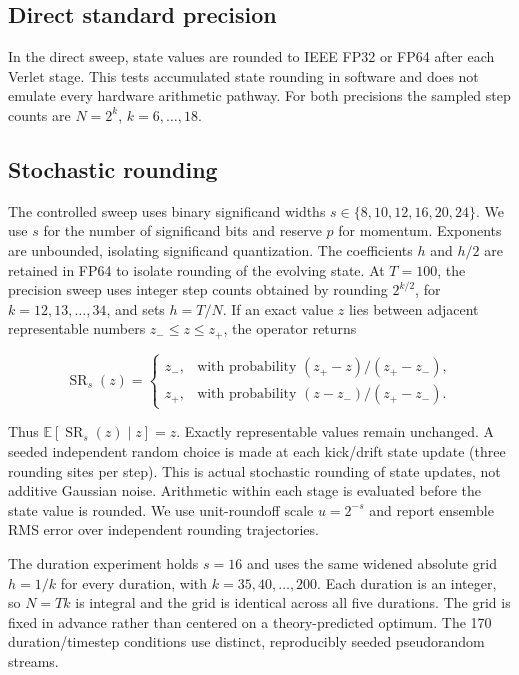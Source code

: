 \documentclass[
11pt
]{article}
\begin{document}
\subsection{Direct standard precision}\label{direct-standard-precision}

In the direct sweep, state values are rounded to IEEE FP32 or FP64 after
each Verlet stage. This tests accumulated state rounding in software and
does not emulate every hardware arithmetic pathway. For both precisions the sampled
step counts are \(N=2^k\), \(k=6,\ldots,18\).

\subsection{Stochastic rounding}\label{stochastic-rounding}

The controlled sweep uses binary significand widths
\(s\in\{8,10,12,16,20,24\}\). We use \(s\) for the number of
significand bits and reserve \(p\) for momentum. Exponents are
unbounded, isolating significand quantization. The coefficients \(h\) and
\(h/2\) are retained in FP64 to isolate rounding of the evolving state.
At \(T=100\), the precision sweep uses integer step counts obtained by
rounding \(2^{k/2}\), for \(k=12,13,\ldots,34\), and sets \(h=T/N\).
If an exact value \(z\) lies between adjacent representable numbers
\(z_-\le z\le z_+\), the operator returns

\[
\operatorname{SR}_s(z)=\begin{cases}
z_-,&\text{with probability }(z_+-z)/(z_+-z_-),\\
z_+,&\text{with probability }(z-z_-)/(z_+-z_-).
\end{cases}
\]

Thus \(\mathbb E[\operatorname{SR}_s(z)\mid z]=z\). Exactly
representable values remain unchanged. A seeded independent random
choice is made at each kick/drift state update (three rounding sites per
step). This is actual stochastic rounding of state updates, not additive
Gaussian noise. Arithmetic within each stage is evaluated before the
state value is rounded. We use unit-roundoff scale \(u=2^{-s}\) and
report ensemble RMS error over independent rounding trajectories.

The duration experiment holds \(s=16\) and uses the same widened
absolute grid \(h=1/k\) for every duration, with \(k=35,40,\ldots,200\).
Each duration is an integer, so \(N=Tk\) is integral and the grid is
identical across all five durations. The grid is fixed in advance rather
than centered on a theory-predicted optimum. The 170 duration/timestep
conditions use distinct, reproducibly seeded pseudorandom streams.
\end{document}
